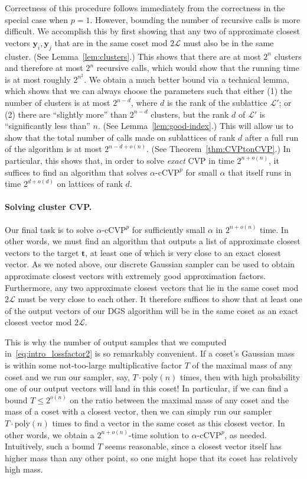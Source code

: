 \documentclass[11pt]{article}
\renewcommand{\vec}[1]{\ensuremath{\mathbf{#1}}}
\newcommand{\problem}[1]{\mbox{#1}\xspace}
\newcommand{\poly}{\mathrm{poly}}
\newcommand{\scarequotes}[1]{``#1''}
\newcommand{\lat}{\mathcal{L}}
\begin{document}
Correctness of this procedure follows immediately from the correctness in the special case when $p=1$. However, bounding the number of recursive calls is more difficult. We accomplish this by first showing that any two of approximate closest vectors $\vec{y}_i, \vec{y}_j$ that are in the same coset mod $2\lat$ must also be in the same cluster. (See Lemma~\ref{lem:clusters}.) This shows that there are at most $2^n$ clusters and therefore at most $2^n$ recursive calls, which would show that the running time is at most roughly $2^{n^2}$. We obtain a much better bound via a technical lemma, which shows that we can always choose the parameters such that either (1) the number of clusters is at most $2^{n-d}$, where $d$ is the rank of the sublattice $\lat'$; or (2) there are \scarequotes{slightly more} than $2^{n-d}$ clusters, but the rank $d$ of $\lat'$ is \scarequotes{significantly less than} $n$. (See Lemma~\ref{lem:good-index}.) This will allow us to show that the total number of calls made on sublattices of rank $d$ after a full run of the algorithm is at most $2^{n-d + o(n)}$. (See Theorem~\ref{thm:CVPtonCVP}.) In particular, this shows that, in order to solve \emph{exact} CVP in time $2^{n+o(n)}$, it suffices to find an algorithm that solves $\alpha\text{-}\problem{cCVP}^p$ for small $\alpha$ that itself runs in time $2^{d+o(d)}$ on lattices of rank $d$.

\paragraph{Solving cluster CVP. } Our final task is to solve $\alpha\text{-}\problem{cCVP}^p$ for sufficiently small $\alpha$ in $2^{n + o(n)}$ time. In other words, we must find an algorithm that outputs a list of approximate closest vectors to the target $\vec{t}$, at least one of which is very close to an exact closest vector. As we noted above, our discrete Gaussian sampler can be used to obtain approximate closest vectors with extremely good approximation factors. Furthermore, any two approximate closest vectors that lie in the same coset mod $2\lat$ must be very close to each other. It therefore suffices to show that at least one of the output vectors of our DGS algorithm will be in the same coset as an exact closest vector mod $2\lat$.

This is why the number of output samples that we computed in~\eqref{eq:intro_lossfactor2} is so remarkably convenient. If a coset's Gaussian mass is within some not-too-large multiplicative factor $T$ of the maximal mass of any coset and we run our sampler, say, $T\cdot \poly(n)$ times, then with high probability one of our output vectors will land in this coset! In particular, if we can find a bound $T \leq 2^{o(n)}$ on the ratio between the maximal mass of any coset and the mass of a coset with a closest vector, then we can simply run our sampler $T \cdot \poly(n)$ times to find a vector in the same coset as this closest vector. In other words, we obtain a $2^{n+o(n)}$-time solution to $\alpha\text{-}\problem{cCVP}^p$, as needed. Intuitively, such a bound $T$ seems reasonable, since a closest vector itself has higher mass than any other point, so one might hope that its coset has relatively high mass.
\end{document}
